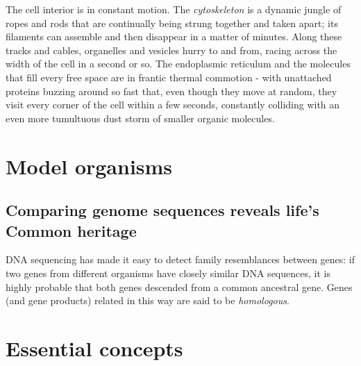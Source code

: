 The cell interior is in constant motion. The \textit{cytoskeleton} is a dynamic
jungle of ropes and rods that are continually being strung together and
taken apart; its filaments can assemble and then disappear in a matter
of minutes. Along these tracks and cables, organelles and
vesicles hurry to and from, racing across the width of the cell in a second or so. The
endoplasmic reticulum and the molecules that fill every free space are in
frantic thermal commotion - with unattached proteins buzzing around
so fast that, even though they move at random, they visit every corner
of the cell within a few seconds, constantly colliding with an even more
tumultuous dust storm of smaller organic molecules.

\section{Model organisms}

\subsection{Comparing genome sequences reveals life’s Common heritage}

DNA sequencing has made it easy to detect family resemblances between
genes: if two genes from different organisms have closely similar DNA
sequences, it is highly probable that both genes descended from a common
ancestral gene. Genes (and gene products) related in this way are
said to be \textit{homologous}.

\section{Essential concepts}



